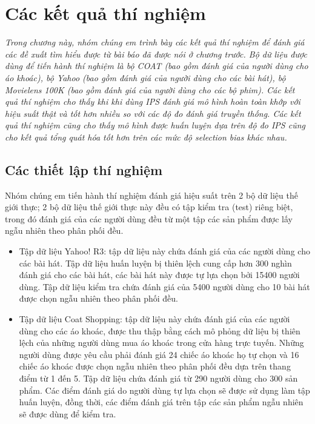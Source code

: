 \chapter{Các kết quả thí nghiệm}
\label{Chapter4}

\noindent\textit{Trong chương này, nhóm chúng em trình bày các kết quả thí nghiệm để đánh giá các đề xuất tìm hiểu được từ bài báo đã được nói ở chương trước. Bộ dữ liệu được dùng để tiến hành thí nghiệm là bộ COAT (bao gồm đánh giá của người dùng cho áo khoác), bộ Yahoo (bao gồm đánh giá của người dùng cho các bài hát), bộ Movielens 100K (bao gồm đánh giá của người dùng cho các bộ phim). Các kết quả thí nghiệm cho thấy khi khi dùng IPS đánh giá mô hình hoàn toàn khớp với hiệu suất thật và tốt hơn nhiều so với các độ đo đánh giá truyền thống. Các kết quả thí nghiệm cũng cho thấy mô hình được huấn luyện dựa trên độ đo IPS cũng cho kết quả tổng quát hóa tốt hơn trên các mức độ selection bias khác nhau.}

\section{Các thiết lập thí nghiệm}
\label{sec:4_setup}
Nhóm chúng em tiến hành thí nghiệm đánh giá hiệu suất trên 2 bộ dữ liệu thế giới thực; 2 bộ dữ liệu thế giới thực này đều có tập kiểm tra (test) riêng biệt, trong đó đánh giá của các người dùng đều từ một tập các sản phẩm được lấy ngẫu nhiên theo phân phối đều.
\begin{itemize}
    \item Tập dữ liệu Yahoo! R3: tập dữ liệu này chứa đánh giá của các người dùng cho các bài hát. Tập dữ liệu huấn luyện bị thiên lệch cung cấp hơn 300 nghìn đánh giá cho các bài hát, các bài hát này được tự lựa chọn bởi 15400 người dùng. Tập dữ liệu kiểm tra chứa đánh giá của 5400 người dùng cho 10 bài hát được chọn ngẫu nhiên theo phân phối đều.
    \item Tập dữ liệu Coat Shopping: tập dữ liệu này chứa đánh giá của các người dùng cho các áo khoác, được thu thập bằng cách mô phỏng dữ liệu bị thiên lệch của những người dùng mua áo khoác trong cửa hàng trực tuyến. Những người dùng được yêu cầu phải đánh giá 24 chiếc áo khoác họ tự chọn và 16 chiếc áo khoác được chọn ngẫu nhiên theo phân phối đều dựa trên thang điểm từ 1 đến 5. Tập dữ liệu chứa đánh giá từ 290 người dùng cho 300 sản phẩm. Các điểm đánh giá do người dùng tự lựa chọn sẽ được sử dụng làm tập huấn luyện, đồng thời, các điểm đánh giá trên tập các sản phẩm ngẫu nhiên sẽ được dùng để kiểm tra. 
\end{itemize}

